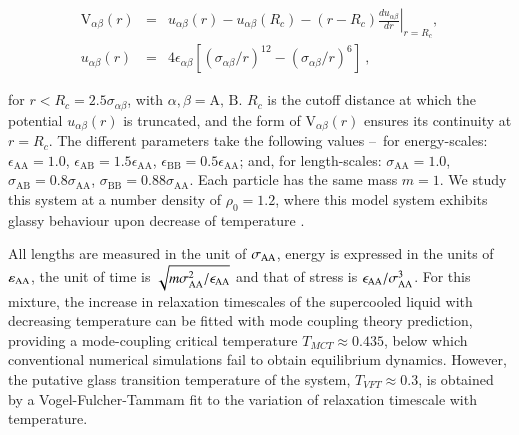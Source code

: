 \begin{eqnarray}
\label{LJ1}
\textrm{V}_{\alpha\beta}(r) &=&  u_{\alpha\beta}(r)-u_{\alpha\beta}(R_{c})-\left(r-R_{c}\right)\left. \frac{du_{\alpha\beta}}{dr}\right|_{r=R_{c}},\nonumber\\
u_{\alpha\beta}(r) &=& 4\epsilon_{\alpha\beta}\left[\left(\sigma_{\alpha\beta}/r\right)^{12}- \left(\sigma_{\alpha\beta}/r\right)^{6}\right]\: ,
\end{eqnarray}

for $ r < R_{c} = 2.5\sigma_{\alpha \beta} $, with $\alpha, \beta = \textrm{A, B}$. $R_c$ is the cutoff distance at which the  potential $u_{\alpha\beta}(r)$ is truncated, and the form of $\textrm{V}_{\alpha\beta}(r)$ ensures its continuity at $r=R_c$. The different parameters take the following values \---\ for energy-scales:  $\epsilon_{\textrm{AA}} = 1.0$, $\epsilon_{\textrm{AB}} = 1.5\epsilon_{\textrm{AA}}$, $\epsilon_{\textrm{BB}} = 0.5\epsilon_{\textrm{AA}}$; and, for length-scales: $\sigma_{\textrm{AA}} = 1.0$, $\sigma_{\textrm{AB}} = 0.8\sigma_{\textrm{AA}}$, $\sigma_{\textrm{BB}} = 0.88\sigma_{\textrm{AA}}$. Each particle has the same mass $m=1$. We study this system at a number density of $\rho_0 = 1.2$, where this model system exhibits glassy behaviour upon decrease of temperature \cite{Kob94}.

All lengths are measured in the unit of $\sigma_{\rm AA}$, energy is expressed in the units of $\varepsilon_{\rm AA}$, the unit of time is $\sqrt{{m\sigma_{\rm AA}^{2}}/\epsilon_{\rm AA}}$ and that of stress is $\epsilon_{\rm AA}/ \sigma_{\rm AA}^{3}$. For this mixture,  the increase in relaxation timescales of the supercooled liquid with decreasing temperature can be fitted with mode coupling theory prediction, providing a mode-coupling critical temperature $T_{MCT} \approx 0.435$, below which conventional numerical simulations fail to obtain equilibrium dynamics. However, the putative glass transition temperature of the system, $T_{VFT} \approx 0.3$, is obtained by a Vogel-Fulcher-Tammam fit to the variation of relaxation timescale with temperature. 

